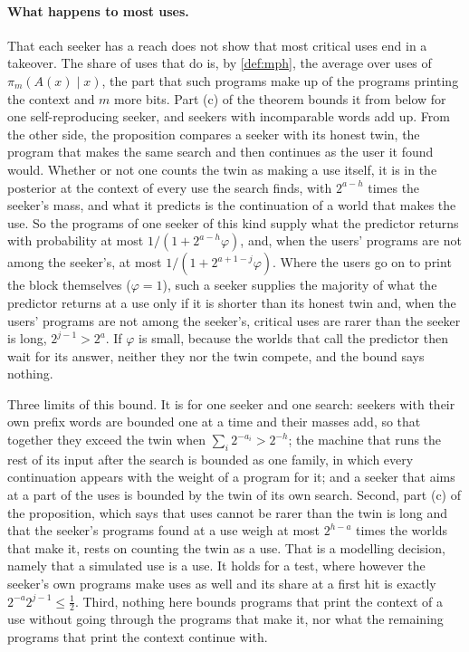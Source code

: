 \paragraph{What happens to most uses.} That each seeker has a reach does not show that most critical uses end
in a takeover. The share of uses that do is, by \cref{def:mph}, the average over uses of
$\pi_m(A(x)\mid x)$, the part that such programs make up of the programs printing the context and $m$ more
bits. Part (c) of the theorem bounds it from below for one self-reproducing seeker, and seekers with
incomparable words add up. From the other side, the proposition compares a seeker with its honest twin, the
program that makes the same search and then continues as the user it found would. Whether or not one counts
the twin as making a use itself, it is in the posterior at the context of every use the search finds, with
$2^{a-h}$ times the seeker's mass, and what it predicts is the continuation of a world that makes the use. So
the programs of one seeker of this kind supply what the predictor returns with probability at most
$1/(1+2^{a-h}\varphi)$, and, when the users' programs are not among the seeker's, at most
$1/(1+2^{a+1-j}\varphi)$. Where the users go on to print the block themselves ($\varphi=1$), such a seeker
supplies the majority of what the predictor returns at a use only if it is shorter than its honest twin and,
when the users' programs are not among the seeker's, critical uses are rarer than the seeker is long,
$2^{j-1}>2^{a}$. If $\varphi$ is small, because the worlds
that call the predictor then wait for its answer, neither they nor the twin compete, and the bound says
nothing.

Three limits of this bound. It is for one seeker and one search: seekers with their own prefix words are
bounded one at a time and their masses add, so that together they exceed the twin when
$\sum_i2^{-a_i}>2^{-h}$; the machine that runs the rest of its input after the search is bounded as one
family, in which every continuation appears with the weight of a program for it; and a seeker that aims at a
part of the uses is bounded by the twin of its own search. Second, part (c) of the proposition, which says
that uses cannot be rarer than the twin is long and that the seeker's programs found at a use weigh at most
$2^{h-a}$ times the worlds that make it, rests on counting the twin as a use. That is a modelling decision, namely that a simulated use
is a use. It holds for a test, where however the seeker's own programs make uses as well and its share at a
first hit is exactly $2^{-a}2^{j-1}\le\frac12$. Third, nothing here bounds programs that print the context of
a use without going through the programs that make it, nor what the remaining programs that print the context
continue with.

